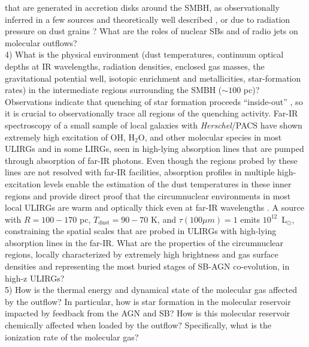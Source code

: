 \documentclass{pasa}%
\newcommand{\Lsun}{{\hbox {L$_\odot$}}}
\begin{document}
that are generated in accretion disks around the SMBH, as observationally
inferred in a few sources \citep{tom15,fer15,vei17} and theoretically
well described \citep[e.g.][]{fau12,kin15,ric17}, or due to radiation
pressure on dust grains \citep{mur05,rot12,tho15,ish15}?  
What are the roles of nuclear SBs and of radio jets on molecular
outflows? \\
4) What is the physical environment (dust temperatures, continuum
optical depths at IR wavelengths, radiation densities, enclosed gas
masses, the gravitational potential well, isotopic enrichment and
metallicities, star-formation rates) in the intermediate regions surrounding
the SMBH ($\sim100$ pc)? Observations indicate that quenching of star
formation proceeds “inside-out” \citep{tac15}, so it is crucial to
observationally trace all regions of the quenching activity.  Far-IR
spectroscopy of a small sample of local galaxies with {\it Herschel}/PACS 
have shown extremely high excitation of OH, H$_2$O, and other molecular
species in most ULIRGs and in some LIRGs, seen in high-lying absorption lines
that are pumped through absorption of far-IR photons. Even though 
the regions probed by these lines are not resolved with far-IR facilities,
absorption profiles in
multiple high-excitation levels enable the estimation of the dust
temperatures in these inner regions and provide direct proof that the
circumnuclear environments in most local 
ULIRGs are warm and optically thick even at far-IR wavelengths 
\citep[$T_{\mathrm{dust}}>60$ K, GA14,][hereafter GA15]{gon15}. A source
with $R=100-170$ pc, $T_{\mathrm{dust}}=90-70$ K, and $\tau(100\mu m)=1$ emits
$10^{12}$~\Lsun, constraining the spatial scales that are probed in ULIRGs
with high-lying absorption lines in the far-IR. What are the properties of the
circumnuclear regions, locally characterized by extremely high brightness and
gas surface densities and representing the most buried stages of SB-AGN
co-evolution, in high-z ULIRGs? \\
5) How is the thermal energy and dynamical state of the molecular gas affected
by the outflow?  In particular, how is star formation in the molecular
reservoir impacted by feedback from the AGN and SB? How is
this molecular reservoir chemically affected when loaded by the outflow?
Specifically, what is the ionization rate of the molecular gas? 
\end{document}

